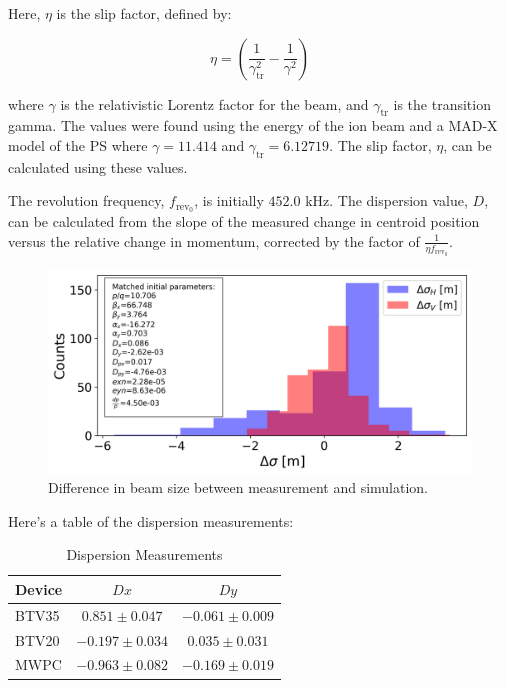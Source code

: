 \documentclass[a4paper,
               ]{jacow}
\begin{document}
Here, $\eta$ is the slip factor, defined by:

\begin{equation}
\eta = \left(\frac{1}{\gamma_{\text{tr}}^{2}} - \frac{1}{\gamma^{2}}\right)
\end{equation}

where $\gamma$ is the relativistic Lorentz factor for the beam, and $\gamma_{\text{tr}}$ is the transition gamma. The values were found using the energy of the ion beam and a MAD-X model of the PS where $\gamma = 11.414$ and $\gamma_{\text{tr}} = 6.12719$. The slip factor, $\eta$, can be calculated using these values.

The revolution frequency, $f_{\text{rev}_0}$, is initially $452.0$ kHz. The dispersion value, $D$, can be calculated from the slope of the measured change in centroid position versus the relative change in momentum, corrected by the factor of $\frac{1}{\eta f_{\text{rev}_0}}$.



\begin{figure}[!htb]
   \centering
   \includegraphics*[width=1.0\columnwidth]{beam_size_diff.png}
   \caption{Difference in beam size between measurement and simulation.}
   \label{fig:diff_beam_size}
\end{figure}

Here's a table of the dispersion measurements:

\begin{table}[h!]
\centering
\caption{Dispersion Measurements}
\begin{tabular}{l c c}
\hline
Device & \(Dx\) & \(Dy\) \\
\hline
BTV35  & \(0.851 \pm 0.047\) & \(-0.061 \pm 0.009\) \\
BTV20  & \(-0.197 \pm 0.034\) & \(0.035 \pm 0.031\) \\
MWPC   & \(-0.963 \pm 0.082\) & \(-0.169 \pm 0.019\) \\
\hline
\end{tabular}
\end{table}
\end{document}
